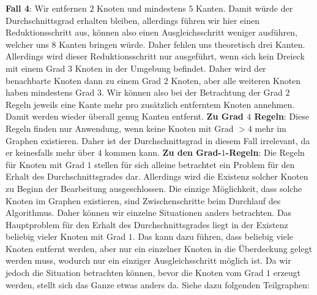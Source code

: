 \documentclass[12pt,onecolumn, notitlepage]{scrartcl}
\begin{document}
\textbf{Fall 4}: Wir entfernen $2$ Knoten und mindestens $5$ Kanten. Damit würde der Durchschnittsgrad erhalten bleiben, allerdings führen wir hier einen Reduktionsschritt aus, können also einen Ausgleichsschritt weniger ausführen, welcher uns 8 Kanten bringen würde. Daher fehlen uns theoretisch drei Kanten. Allerdings wird dieser Reduktionsschritt nur ausgeführt, wenn sich kein Dreieck mit einem Grad $3$ Knoten in der Umgebung befindet. Daher wird der benachbarte Knoten dann zu einem Grad $2$ Knoten, aber alle weiteren Knoten haben mindestens Grad $3$. Wir können also bei der Betrachtung der Grad $2$ Regeln jeweils eine Kante mehr pro zusätzlich entferntem Knoten annehmen. Damit werden wieder überall genug Kanten entfernt.\newline\newline
\textbf{Zu Grad $4$ Regeln}:\newline
Diese Regeln finden nur Anwendung, wenn keine Knoten mit Grad $> 4$ mehr im Graphen existieren. Daher ist der Durchschnittsgrad in diesem Fall irrelevant, da er keinesfalls mehr über $4$ kommen kann.\newline\newline
\textbf{Zu den Grad-$1$-Regeln}:\newline
Die Regeln für Knoten mit Grad $1$ stellen für sich alleine betrachtet ein Problem für den Erhalt des Durchschnittsgrades dar. Allerdings wird die Existenz solcher Knoten zu Beginn der Bearbeitung ausgeschlossen. Die einzige Möglichkeit, dass solche Knoten im Graphen existieren, sind Zwischenschritte beim Durchlauf des Algorithmus. Daher können wir einzelne Situationen anders betrachten. \newline
Das Hauptproblem für den Erhalt des Durchschnittsgrades liegt in der Existenz beliebig vieler Knoten mit Grad $1$. Das kann dazu führen, dass beliebig viele Knoten entfernt werden, aber nur ein einzelner Knoten in die Überdeckung gelegt werden muss, wodurch nur ein einziger Ausgleichsschritt möglich ist. Da wir jedoch die Situation betrachten können, bevor die Knoten vom Grad $1$ erzeugt werden, stellt sich das Ganze etwas anders da. Siehe dazu folgenden Teilgraphen:\newline
\begin{center}
\end{center}
\end{document}
